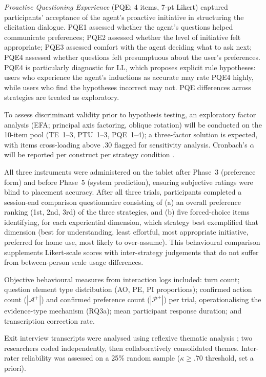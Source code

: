 \documentclass[manuscript,review,anonymous]{acmart}
\begin{document}
\textit{Proactive Questioning Experience} (PQE; 4 items, 7-pt Likert) captured participants' acceptance of the agent's proactive initiative in structuring the elicitation dialogue. PQE1 assessed whether the agent's questions helped communicate preferences; PQE2 assessed whether the level of initiative felt appropriate; PQE3 assessed comfort with the agent deciding what to ask next; PQE4 assessed whether questions felt presumptuous about the user's preferences. PQE4 is particularly diagnostic for LL, which proposes explicit rule hypotheses: users who experience the agent's inductions as accurate may rate PQE4 highly, while users who find the hypotheses incorrect may not. PQE differences across strategies are treated as exploratory.

To assess discriminant validity prior to hypothesis testing, an exploratory factor analysis (EFA; principal axis factoring, oblique rotation) will be conducted on the 10-item pool (TE~1--3, PTU~1--3, PQE~1--4); a three-factor solution is expected, with items cross-loading above .30 flagged for sensitivity analysis. Cronbach's $\alpha$ will be reported per construct per strategy condition \citep{schrum2023likert}.

All three instruments were administered on the tablet after Phase~3 (preference form) and before Phase~5 (system prediction), ensuring subjective ratings were blind to placement accuracy. After all three trials, participants completed a session-end comparison questionnaire consisting of (a) an overall preference ranking (1st, 2nd, 3rd) of the three strategies, and (b) five forced-choice items identifying, for each experiential dimension, which strategy best exemplified that dimension (best for understanding, least effortful, most appropriate initiative, preferred for home use, most likely to over-assume). This behavioural comparison supplements Likert-scale scores with inter-strategy judgements that do not suffer from between-person scale usage differences.

Objective behavioural measures from interaction logs included: turn count; question element type distribution (AO, PE, PI proportions); confirmed action count ($|\mathcal{A}^+|$) and confirmed preference count ($|\mathcal{P}^+|$) per trial, operationalising the evidence-type mechanism (RQ3a); mean participant response duration; and transcription correction rate.

Exit interview transcripts were analysed using reflexive thematic analysis \citep{braun2006using}; two researchers coded independently, then collaboratively consolidated themes. Inter-rater reliability was assessed on a 25\% random sample ($\kappa \geq .70$ threshold, set a priori).
\end{document}
